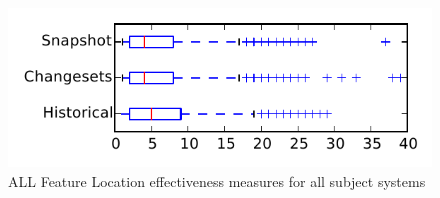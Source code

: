 
\begin{figure}
\centering
\includegraphics[height=0.4\textheight]{figures/flt/all_tiny}
\caption{ALL Feature Location effectiveness measures for all subject systems}
\label{fig:flt:all:tiny}
\end{figure}
